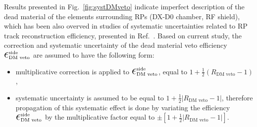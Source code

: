 Results presented in Fig.~\ref{fig:systDMveto} indicate imperfect description of the dead material of the elements surrounding RPs (DX-D0 chamber, RF shield), which has been also overved in studies of systematic uncertainties related to RP track reconstruction efficiency, presented in Ref.~\cite{supplementaryNote}. Based on current study, the correction and systematic uncertainty of the dead material veto efficiency $\mbox{\LARGE$\epsilon$}_{\text{DM~veto}}^{\text{side}}$ are assumed to have the following form: 
\begin{itemize}
\item multiplicative correction is applied to $\mbox{\LARGE$\epsilon$}_{\text{DM~veto}}^{\text{side}}$, equal to $1+\frac{1}{2}(R_{\text{DM~veto}}-1)$,
 \item systematic uncertainty is assumed to be equal to $1+\frac{1}{2}|R_{\text{DM~veto}}-1|$, therefore propagation of this systematic effect is done by variating the efficiency $\mbox{\LARGE$\epsilon$}_{\text{DM~veto}}^{\text{side}}$ by the multiplicative factor equal to $\pm\left[1+\frac{1}{2}|R_{\text{DM~veto}}-1|\right]$. 
\end{itemize} 



